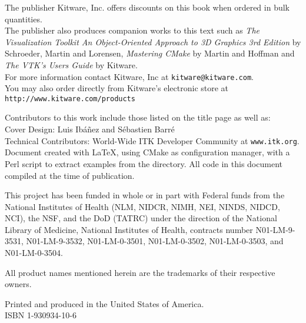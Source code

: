 \begin{minipage}[t][3.2cm][b]{\textwidth}
\begin{center}
The publisher Kitware, Inc. offers discounts on this book when ordered in
bulk quantities.\\
The publisher also produces companion works to this text such as \emph{The
Visualization Toolkit An Object-Oriented Approach to 3D Graphics 3rd Edition}
by Schroeder, Martin and Lorensen, \emph{Mastering CMake} by Martin and
Hoffman and \emph{The VTK's Users Guide} by Kitware.\\
For more information contact Kitware, Inc at \texttt{kitware@kitware.com}.\\
You may also order directly from Kitware's electronic store at
\texttt{http://www.kitware.com/products}\\
\end{center}
\end{minipage}

\begin{minipage}[t][2.7cm][b]{\textwidth}
\begin{center}
Contributors to this work include those listed on the title page as well
as:\\ Cover Design: Luis Ib\'{a}\~{n}ez and S\'{e}bastien Barr\'{e}\\
Technical Contributors: World-Wide ITK Developer Community at
\texttt{www.itk.org}. \\Document created with \LaTeX{}, using CMake as
configuration manager, with a Perl script to extract examples from the
 directory. All code in this document compiled at
the time of publication.
\end{center}
\end{minipage}


\begin{minipage}[t][2.5cm][b]{\textwidth}
\begin{center}
This project has been funded in whole or in part with Federal funds from the
National Institutes of Health (NLM, NIDCR, NIMH, NEI, NINDS, NIDCD, NCI), the
NSF, and the DoD (TATRC) under the direction of the National Library of
Medicine, National Institutes of Health, contracts number N01-LM-9-3531,
N01-LM-9-3532, N01-LM-0-3501, N01-LM-0-3502, N01-LM-0-3503, and
N01-LM-0-3504.
\end{center}
\end{minipage}


\begin{minipage}[t][1.0cm][b]{\textwidth}
\begin{center}
All product names mentioned herein are the trademarks of their respective 
owners.
\end{center}
\end{minipage}


\begin{minipage}[t][1.0cm][b]{\textwidth}
\begin{center}
Printed and produced in the United States of America.\\
ISBN 1-930934-10-6
\end{center}
\end{minipage}
